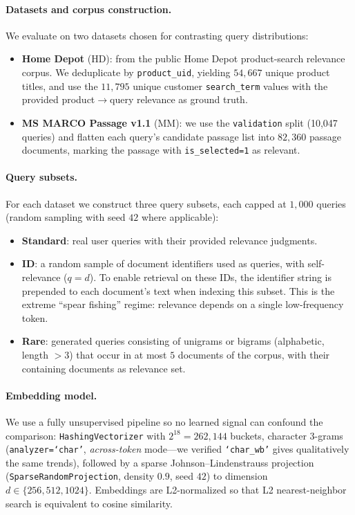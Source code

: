 \documentclass[conference]{IEEEtran}
\begin{document}
\paragraph{Datasets and corpus construction.}
We evaluate on two datasets chosen for contrasting query distributions:
\begin{itemize}
\item \textbf{Home Depot} (HD): from the public Home Depot product-search relevance corpus. We deduplicate by \texttt{product\_uid}, yielding $54{,}667$ unique product titles, and use the $11{,}795$ unique customer \texttt{search\_term} values with the provided product$\to$query relevance as ground truth.
\item \textbf{MS MARCO Passage v1.1} (MM): we use the \texttt{validation} split (10{,}047 queries) and flatten each query's candidate passage list into $82{,}360$ passage documents, marking the passage with \texttt{is\_selected=1} as relevant.
\end{itemize}

\paragraph{Query subsets.}
For each dataset we construct three query subsets, each capped at $1{,}000$ queries (random sampling with seed $42$ where applicable):
\begin{itemize}
\item \textbf{Standard}: real user queries with their provided relevance judgments.
\item \textbf{ID}: a random sample of document identifiers used as queries, with self-relevance ($q{=}d$). To enable retrieval on these IDs, the identifier string is prepended to each document's text when indexing this subset. This is the extreme ``spear fishing'' regime: relevance depends on a single low-frequency token.
\item \textbf{Rare}: generated queries consisting of unigrams or bigrams (alphabetic, length $>3$) that occur in at most $5$ documents of the corpus, with their containing documents as relevance set.
\end{itemize}

\paragraph{Embedding model.}
We use a fully unsupervised pipeline so no learned signal can confound the comparison: \texttt{HashingVectorizer} with $2^{18}{=}262{,}144$ buckets, character $3$-grams (\texttt{analyzer=`char'}, \emph{across-token} mode---we verified \texttt{`char\_wb'} gives qualitatively the same trends), followed by a sparse Johnson--Lindenstrauss projection (\texttt{SparseRandomProjection}, density $0.9$, seed $42$) to dimension $d\in\{256,512,1024\}$. Embeddings are L2-normalized so that L2 nearest-neighbor search is equivalent to cosine similarity.
\end{document}
